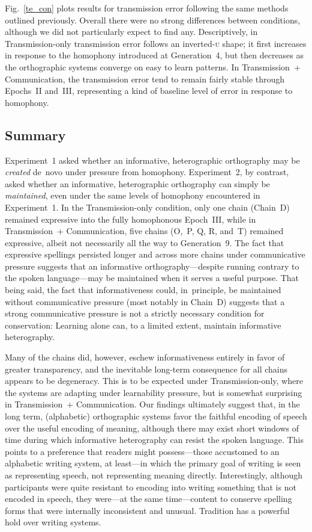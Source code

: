\documentclass[doc,biblatex]{apa7}
\begin{document}
Fig.~\ref{te_con} plots results for transmission error following the same methods outlined previously. Overall there were no strong differences between conditions, although we did not particularly expect to find any. Descriptively, in Transmission-only transmission error follows an inverted-\textsc{u} shape; it first increases in response to the homophony introduced at Generation~4, but then decreases as the orthographic systems converge on easy to learn patterns. In Transmission~+ Communication, the transmission error tend to remain fairly stable through Epochs~II and~III, representing a kind of baseline level of error in response to homophony.

\subsection{Summary}

Experiment~1 asked whether an informative, heterographic orthography may be \textit{created} de~novo under pressure from homophony. Experiment~2, by contrast, asked whether an informative, heterographic orthography can simply be \textit{maintained}, even under the same levels of homophony encountered in Experiment~1. In the Transmission-only condition, only one chain (Chain~D) remained expressive into the fully homophonous Epoch~III, while in Transmission~+ Communication, five chains (O,~P, Q, R, and~T) remained expressive, albeit not necessarily all the way to Generation~9. The fact that expressive spellings persisted longer and across more chains under communicative pressure suggests that an informative orthography---despite running contrary to the spoken language---may be maintained when it serves a useful purpose. That being said, the fact that informativeness could, in~principle, be maintained without communicative pressure (most notably in Chain~D) suggests that a strong communicative pressure is not a strictly necessary condition for conservation: Learning alone can, to a limited extent, maintain informative heterography.

Many of the chains did, however, eschew informativeness entirely in favor of greater transparency, and the inevitable long-term consequence for all chains appears to be degeneracy. This is to be expected under Transmission-only, where the systems are adapting under learnability pressure, but is somewhat surprising in Transmission~+ Communication. Our findings ultimately suggest that, in the long term, (alphabetic) orthographic systems favor the faithful encoding of speech over the useful encoding of meaning, although there may exist short windows of time during which informative heterography can resist the spoken language. This points to a preference that readers might possess---those accustomed to an alphabetic writing system, at least---in which the primary goal of writing is seen as representing speech, not representing meaning directly. Interestingly, although participants were quite resistant to encoding into writing something that is not encoded in speech, they were---at the same time---content to conserve spelling forms that were internally inconsistent and unusual. Tradition has a powerful hold over writing systems.
\end{document}
